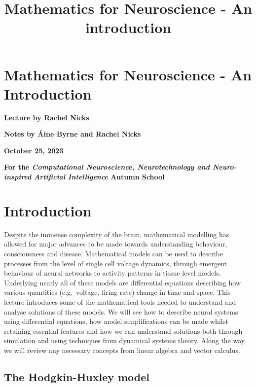 \documentclass[11pt]{article}
\title{Mathematics for Neuroscience - An introduction }
\date{}
\begin{document}
    \maketitle
    



    \hypertarget{mathematics-for-neuroscience---an-introduction}{%
\section{Mathematics for Neuroscience - An
Introduction}\label{mathematics-for-neuroscience---an-introduction}}

\textbf{Lecture by Rachel Nicks}

\textbf{Notes by Áine Byrne and Rachel Nicks}

\textbf{October 25, 2023}

\textbf{For the \emph{Computational Neuroscience, Neurotechnology and
Neuro-inspired Artificial Intelligence} Autumn School}

\hypertarget{introduction}{%
\section{Introduction}\label{introduction}}

Despite the immense complexity of the brain, mathematical modelling has
allowed for major advances to be made towards understanding behaviour,
consciousness and disease. Mathematical models can be used to describe
processes from the level of single cell voltage dynamics, through
emergent behaviour of neural networks to activity patterns in tissue
level models. Underlying nearly all of these models are differential
equations describing how various quantities (e.g.~voltage, firing rate)
change in time and space. This lecture introduces some of the
mathematical tools needed to understand and analyse solutions of these
models. We will see how to describe neural systems using differential
equations, how model simplifications can be made whilst retaining
essential features and how we can understand solutions both through
simulation and using techniques from dynamical systems theory. Along the
way we will review any necessary concepts from linear algebra and vector
calculus.

    \hypertarget{the-hodgkin-huxley-model}{%
\subsection{The Hodgkin-Huxley model}\label{the-hodgkin-huxley-model}}
\end{document}

